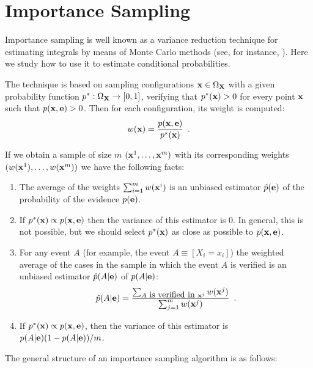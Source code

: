 \section{Importance Sampling}

Importance sampling is well known as a variance reduction
technique for estimating integrals by means of Monte Carlo methods
(see, for instance, \cite{Rub81}). Here we study how to use it to
estimate conditional probabilities.

The technique is based on sampling configurations $\mathbf{x} \in
\Omega_{\mathbf{X}}$ with a given probability function $p^*:\Omega_{\mathbf{X}}
\rightarrow [0,1]$, verifying that $p^*(\mathbf{x})>0$ for every point
$\mathbf{x}$ such that $p(\mathbf{x},\mathbf{e} )>0$. Then for each configuration, its
weight is computed:
\begin{equation}
  w(\mathbf{x}) = \frac{p(\mathbf{x},\mathbf{e})}{p^*(\mathbf{x})} \enspace .
\end{equation}

If we obtain a sample of size $m$ $(\mathbf{x}^1,\ldots,\mathbf{x}^m)$ with
its corresponding weights $(w(\mathbf{x}^1),\ldots,w(\mathbf{x}^m))$ we have the
following facts:

\begin{enumerate}
\item The average of the weights $\sum_{i=1}^{m}w(\mathbf{x}^i)$ is an
  unbiased estimator $\hat{p}(\mathbf{e})$ of the probability of the
  evidence $p(\mathbf{e})$.
  
\item If $p^*(\mathbf{x}) \propto p(\mathbf{x},\mathbf{e})$ then the variance of this
  estimator is 0. In general, this is not possible, but we should
  select $p^*(\mathbf{x})$ as close as possible to $p(\mathbf{x},\mathbf{e})$.
  
\item For any event $A$ (for example, the event $A \equiv
  [X_i=x_i]$) the weighted average of the cases in the sample in
  which the event $A$ is verified is an unbiased estimator
  $\hat{p}(A|\mathbf{e})$ of $p(A|\mathbf{e})$:
  \begin{equation}
    \hat{p}(A|\mathbf{e}) = \frac{\sum_{A \mbox{ is verified in } \mathbf{x}^j}
      { w(\mathbf{x}^j) }}{ \sum_{j=1}^{m}w(\mathbf{x}^j)}
    \enspace .
    \label{eq:estimation}
  \end{equation}
  
\item If $p^*(\mathbf{x}) \propto p(\mathbf{x},\mathbf{e})$, then the variance of this
  estimator is $p(A|\mathbf{e})(1-p(A|\mathbf{e}))/m$.

\end{enumerate}

The general structure of an importance sampling algorithm is as follows:

